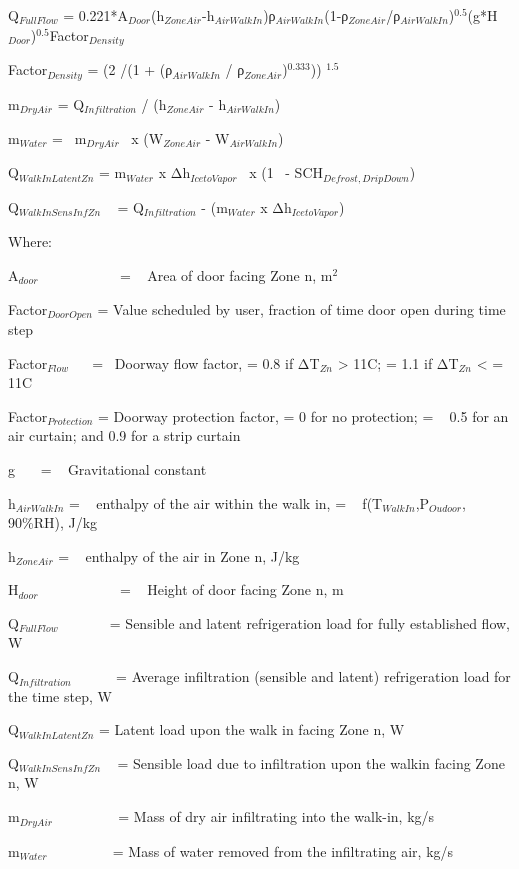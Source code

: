 Q\(_{FullFlow}\) = 0.221*A\(_{Door}\)(h\(_{ZoneAir}\)-h\(_{AirWalkIn}\))ρ\(_{AirWalkIn}\)(1-ρ\(_{ZoneAir}\)/ρ\(_{AirWalkIn}\))\(^{0.5}\)(g*H\(_{Door}\))\(^{0.5}\)Factor\(_{Density}\)

Factor\(_{Density}\) = (2 /(1 + (ρ\(_{AirWalkIn}\) / ρ\(_{ZoneAir}\))\(^{0.333}\))) \(^{1.5}\)

m\(_{DryAir}\) = Q\(_{Infiltration}\) / (h\(_{ZoneAir}\) - h\(_{AirWalkIn}\))

m\(_{Water}\) = ~m\(_{DryAir}\) ~x (W\(_{ZoneAir}\) - W\(_{AirWalkIn}\))

Q\(_{WalkInLatentZn}\) = m\(_{Water}\) x Δh\(_{IcetoVapor}\) ~x (1 ~- SCH\(_{Defrost,DripDown}\))

Q\(_{WalkInSensInfZn}\) ~ = Q\(_{Infiltration}\) - (m\(_{Water}\) x Δh\(_{IcetoVapor}\))

Where:

A\(_{door}\)~~~~~~~~~~~ = ~ Area of door facing Zone n, m\(^{2}\)

Factor\(_{DoorOpen}\) = Value scheduled by user, fraction of time door open during time step

Factor\(_{Flow}\) ~~ = ~Doorway flow factor, = 0.8 if ΔT\(_{Zn}\) \textgreater{} 11C; = 1.1 if ΔT\(_{Zn}\) \textless{} = 11C

Factor\(_{Protection}\) = Doorway protection factor, = 0 for no protection; = ~ 0.5 for an air curtain; and 0.9 for a strip curtain

g~~~ = ~ Gravitational constant

h\(_{AirWalkIn}\) = ~ enthalpy of the air within the walk in, = ~ f(T\(_{WalkIn}\),P\(_{Oudoor}\), 90\%RH), J/kg

h\(_{ZoneAir}\) = ~ enthalpy of the air in Zone n, J/kg

H\(_{door}\)~~~~~~~~~~~ = ~ Height of door facing Zone n, m

Q\(_{FullFlow}\) ~~~~~~ = Sensible and latent refrigeration load for fully established flow, W

Q\(_{Infiltration}\) ~~~~~ = Average infiltration (sensible and latent) refrigeration load for the time step, W

Q\(_{WalkInLatentZn}\) = Latent load upon the walk in facing Zone n, W

Q\(_{WalkInSensInfZn}\) ~ = Sensible load due to infiltration upon the walkin facing Zone n, W

m\(_{DryAir}\) ~~~~~~~~ = Mass of dry air infiltrating into the walk-in, kg/s

m\(_{Water}\) ~~~~~~~~ = Mass of water removed from the infiltrating air, kg/s

